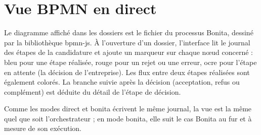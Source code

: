 

\section{Vue BPMN en direct}

Le diagramme affiché dans les dossiers est le fichier  du processus Bonita, dessiné par la bibliothèque bpmn-js. À l'ouverture d'un dossier, l'interface lit le journal des étapes de la candidature et ajoute un marqueur sur chaque nœud concerné : bleu pour une étape réalisée, rouge pour un rejet ou une erreur, ocre pour l'étape en attente (la décision de l'entreprise). Les flux entre deux étapes réalisées sont également colorés. La branche suivie après la décision (acceptation, refus ou complément) est déduite du détail de l'étape de décision.

Comme les modes direct et bonita écrivent le même journal, la vue est la même quel que soit l'orchestrateur ; en mode bonita, elle suit le cas Bonita au fur et à mesure de son exécution.
